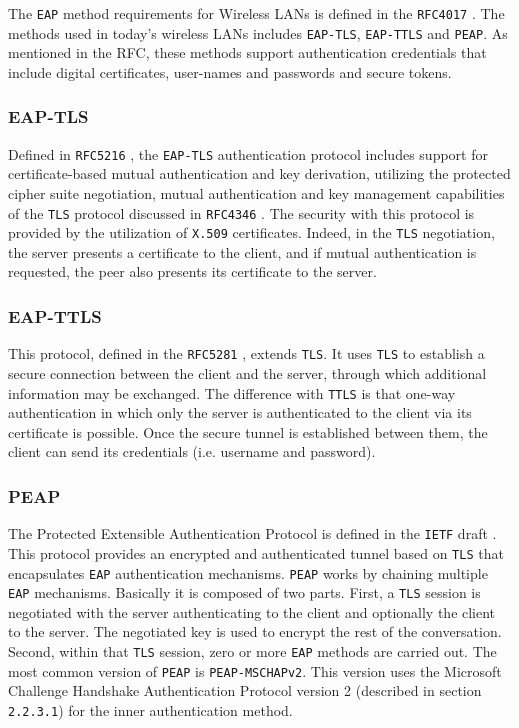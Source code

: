 The \texttt{EAP} method requirements for Wireless LANs is defined in the \texttt{RFC4017} \cite{rfc4017}. The methods used in today's wireless LANs includes \texttt{EAP-TLS}, \texttt{EAP-TTLS} and \texttt{PEAP}. As mentioned in the RFC, these methods support authentication credentials that include digital certificates, user-names and passwords and secure tokens.

\subsubsection{EAP-TLS}
Defined in \texttt{RFC5216} \cite{rfc5216}, the \texttt{EAP-TLS} authentication protocol includes support for certificate-based mutual authentication and key derivation, utilizing the protected cipher suite negotiation, mutual authentication and key management capabilities of the \texttt{TLS} protocol discussed in \texttt{RFC4346} \cite{rfc4346}. The security with this protocol is provided by the utilization of \texttt{X.509} certificates. Indeed, in the \texttt{TLS} negotiation, the server presents a certificate to the client, and if mutual authentication is requested, the peer also presents its certificate to the server.

\subsubsection{EAP-TTLS} 
This protocol, defined in the \texttt{RFC5281} \cite{rfc5281}, extends \texttt{TLS}. It uses \texttt{TLS} to establish a secure connection between the client and the server, through which additional information may be exchanged. The difference with \texttt{TTLS} is that one-way authentication in which only the server is authenticated to the client via its certificate is possible. Once the secure tunnel is established between them, the client can send its credentials (i.e. username and password).

\subsubsection{PEAP} 
The Protected Extensible Authentication Protocol is defined in the \texttt{IETF} draft \cite{peap-draft}. This protocol provides an encrypted and authenticated tunnel based on \texttt{TLS} that encapsulates \texttt{EAP} authentication mechanisms. \texttt{PEAP} works by chaining multiple \texttt{EAP} mechanisms. Basically it is composed of two parts. First, a \texttt{TLS} session is negotiated with the server authenticating to the client and optionally the client to the server. The negotiated key is used to encrypt the rest of the conversation. Second, within that \texttt{TLS} session, zero or more \texttt{EAP} methods are carried out.
The most common version of \texttt{PEAP} is \texttt{PEAP-MSCHAPv2}. This version uses the Microsoft Challenge Handshake Authentication Protocol version 2 (described in section \texttt{2.2.3.1}) for the inner authentication method.



